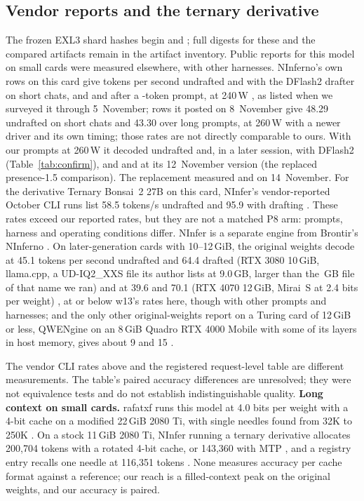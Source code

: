 \documentclass[11pt,letterpaper]{article}
\newcommand{\q}[1]{\texttt{#1}}
\begin{document}
\subsection{Vendor reports and the ternary derivative}
\label{app:ternary}
The frozen EXL3 shard hashes begin \q{\PeShaOne} and \q{\PeShaTwo}; full
digests for these and the compared artifacts remain in the artifact inventory.
Public reports for this model on small cards were measured elsewhere, with
other harnesses. NInferno's own rows on this card give \PeNifUndrafted{}
tokens per second undrafted and \PeNifDflash{} with the DFlash2 drafter on
short chats, and \PeNifDeepUndrafted{} and \PeNifDeepDflash{} after a
\PeNifDeepTokens-token prompt, at 240\,W \citep{brontir2026ninferno}, as
listed when we surveyed it through 5~November; rows it posted on 8~November
give 48.29 undrafted on short chats and 43.30 over long prompts, at 260\,W
with a newer driver and its own timing; those rates are not directly comparable to ours. With
our prompts at 260\,W it decoded \PeCfNifXxsZero{} undrafted and, in a later
session, \PeDfbNifDfZero{} with DFlash2 (Table~\ref{tab:confirm}), and
\PeRfNifNdZero{} and \PeRfNifDfZero{} at its 12~November version
(the replaced presence-1.5 comparison). The replacement measured
\PeFreshNifNdZero{} and \PeFreshNifDfZero{} on 14~November.
For the derivative Ternary Bonsai~2 27B on this card, NInfer's vendor-reported October CLI runs list 58.5 tokens/s undrafted and 95.9 with drafting
\citep{ninfer2026smallcards}. These rates exceed our reported rates, but they
are not a matched P8 arm: prompts, harness and operating conditions differ. NInfer is a separate engine
from Brontir's NInferno \citep{brontir2026ninferno}. On later-generation cards with 10--12\,GiB, the original
weights decode at 45.1 tokens per second undrafted and 64.4 drafted (RTX 3080
10\,GiB, llama.cpp, a UD-IQ2\_XXS file its author lists at 9.0\,GB, larger
than the \PeFileGbIxxs\,GB file of that name we ran) \citep{sudoingx2026mtp}
and at 39.6 and 70.1 (RTX 4070 12\,GiB, Mirai~S at 2.4 bits per weight)
\citep{trymirai2026mirais}, at or below w13's rates here, though with other prompts
and harnesses; and the only other
original-weights report on a Turing card of 12\,GiB or less, QWENgine on an
8\,GiB Quadro RTX 4000 Mobile with some of its layers in host memory, gives
about 9 and 15 \citep{bensaad2026qwengine}.




The vendor CLI rates above and the registered request-level table are different
measurements. The table's paired accuracy differences are unresolved; they
were not equivalence tests and do not establish indistinguishable quality.
\textbf{Long context on small cards.} rafatxf runs this model at 4.0 bits per
weight with a 4-bit cache on a modified 22\,GiB 2080 Ti, with single needles
found from 32K to 250K \citep{rafatxf2026turing}. On a stock 11\,GiB 2080 Ti,
NInfer running a ternary derivative allocates 200,704 tokens with a rotated 4-bit cache, or
143,360 with MTP \citep{ninfer2026smallcards}, and a registry entry recalls
one needle at 116,351 tokens \citep{sybil2026registry}. None measures accuracy
per cache format against a reference; our reach is a filled-context peak on
the original weights, and our accuracy is paired.
\end{document}
